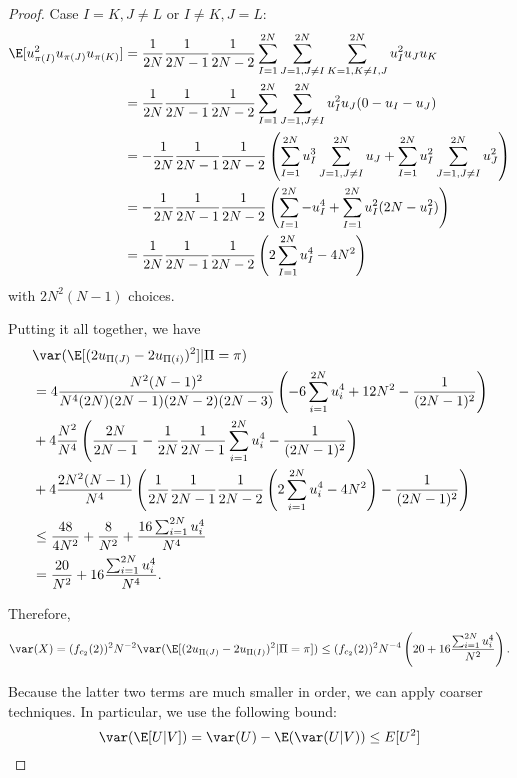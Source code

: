 \begin{proof}
  Case $I=K, J\neq L$ or $I\neq K, J= L$:
  \begin{align*}
    \E[u_{\pi(I)}^2 u_{\pi(J)} u_{\pi(K)}] &= \frac{1}{2N}\frac{1}{2N-1}\frac{1}{2N-2} \sum_{I=1}^{2N}
    \sum_{J=1, J\neq I}^{2N} \sum_{K=1, K \neq I,J}^{2N} u_{I}^2 u_{J} u_{K} \\
    &=\frac{1}{2N}\frac{1}{2N-1}\frac{1}{2N-2} \sum_{I=1}^{2N}
    \sum_{J=1, J\neq I}^{2N} u_{I}^2 u_{J} (0 - u_{I} - u_{J}) \\ 
    &=-\frac{1}{2N}\frac{1}{2N-1}\frac{1}{2N-2} \left(
      \sum_{I=1}^{2N} u_{I}^3 \sum_{J=1, J\neq I}^{2N} u_{J} +
      \sum_{I=1}^{2N} u_{I}^2 \sum_{J=1, J\neq I}^{2N} u_{J}^2
    \right ) \\
    &=-\frac{1}{2N}\frac{1}{2N-1}\frac{1}{2N-2} \left(
      \sum_{I=1}^{2N} - u_{I}^4 + 
      \sum_{I=1}^{2N} u_{I}^2 (2N - u_{I}^2)
    \right ) \\
    &=\frac{1}{2N}\frac{1}{2N-1}\frac{1}{2N-2} \left(
      2 \sum_{I=1}^{2N} u_{I}^4 -4N^2 \right )
  \end{align*}
  with $2N^2(N-1)$ choices.  

  Putting it all together, we have 
  \begin{align*}
    &\var (\E[(2u_{\Pi(J)}-2u_{\Pi(i)})^2] | \Pi = \pi) \\
    &= 4 \frac{N^2(N-1)^2}{N^4(2N)(2N-1)(2N-2)(2N-3)} \left ( -6
      \sum_{i=1}^{2N}u_{i}^4 + 12N^2 - \frac{1}{(2N-1)^2} \right ) \\
    &+ 4 \frac{N^2}{N^4} \left ( \frac{2N}{2N-1} -
    \frac{1}{2N}\frac{1}{2N-1}\sum_{i=1}^{2N}u_{i}^4 - \frac{1}{(2N-1)^2}
  \right ) \\
  &+ 4 \frac{2N^2(N-1)}{N^4} \left ( 
    \frac{1}{2N}\frac{1}{2N-1}\frac{1}{2N-2}\left (
      2 \sum_{i=1}^{2N} u_{i}^4 - 4N^2 \right ) - \frac{1}{(2N-1)^2}
  \right ) \\
  &\leq \frac{48}{4N^2} + \frac{8}{N^2} + \frac{16 \sum_{i=1}^{2N}
    u_{i}^4}{N^4} \\
  &= \frac{20}{N^2} + 16\frac{\sum_{i=1}^{2N} u_{i}^4}{N^4}.
  \end{align*}
  
  Therefore, 
  \begin{equation*}
    \var(X) = (f_{c_2}(2))^2 N^{-2} \var(\E [(2u_{\Pi(J)}-2u_{\Pi(I)})^2 | \Pi = \pi ])
    \leq (f_{c_2}(2))^2 N^{-4} \left (20 + 16\frac{\sum_{i=1}^{2N}
        u_{i}^4}{N^2} \right ).
  \end{equation*}
  
  Because the latter two terms are much smaller in order, we can apply
  coarser techniques.  In particular, we use the following bound:
  \begin{equation*}
    \var (\E[U|V]) = \var(U) - \E (\var (U|V)) \leq E[U^2]
  \end{equation*}


\end{proof}
